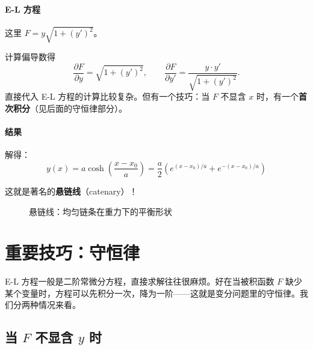 \paragraph{E-L 方程}

这里 $F = y \sqrt{1 + (y')^2}$。

计算偏导数得
\[
\frac{\partial F}{\partial y} = \sqrt{1 + (y')^2}, \qquad
\frac{\partial F}{\partial y'} = \frac{y \cdot y'}{\sqrt{1 + (y')^2}}.
\]
直接代入 E-L 方程的计算比较复杂。但有一个技巧：当 $F$ 不显含 $x$ 时，有一个\textbf{首次积分}（见后面的守恒律部分）。

\paragraph{结果}

解得：
\[
y(x) = a \cosh\left(\frac{x - x_0}{a}\right) = \frac{a}{2}\left(e^{(x-x_0)/a} + e^{-(x-x_0)/a}\right)
\]

这就是著名的\textbf{悬链线}（catenary）！

\begin{figure}[htbp]
\centering
{}
\caption{悬链线：均匀链条在重力下的平衡形状}
\end{figure}



\section{重要技巧：守恒律}

E-L 方程一般是二阶常微分方程，直接求解往往很麻烦。好在当被积函数 $F$ 缺少某个变量时，方程可以先积分一次，降为一阶——这就是变分问题里的守恒律。我们分两种情况来看。

\subsection{当 $F$ 不显含 $y$ 时}

